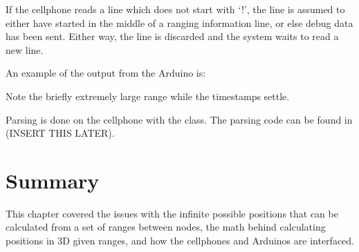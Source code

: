\begin{center}
\end{center}


If the cellphone reads a line which does not start with `!', the line is assumed to either have started in the middle of a ranging information line, or else debug data has been sent. Either way, the line is discarded and the system waits to read a new line.

An example of the output from the Arduino is:


Note the briefly extremely large range while the timestamps settle.

Parsing is done on the cellphone with the  class. The parsing code can be found in (INSERT THIS LATER).

\section{Summary}
This chapter covered the issues with the infinite possible positions that can be calculated from a set of ranges between nodes, the math behind calculating positions in 3D given ranges, and how the cellphones and Arduinos are interfaced.